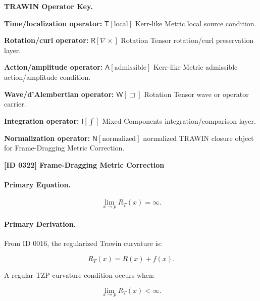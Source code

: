 \par\vspace{0.45\baselineskip}
\noindent\begin{minipage}[t]{\linewidth}
\begingroup
\small
\raggedright
\textbf{TRAWIN Operator Key.}\par
\noindent\textbf{Time/localization operator:} $\mathsf{T}\!\left[\mathrm{local}\right]$ Kerr-like Metric local source condition.\par
\noindent\textbf{Rotation/curl operator:} $\mathsf{R}\!\left[\nabla\times\right]$ Rotation Tensor rotation/curl preservation layer.\par
\noindent\textbf{Action/amplitude operator:} $\mathsf{A}\!\left[\mathrm{admissible}\right]$ Kerr-like Metric admissible action/amplitude condition.\par
\noindent\textbf{Wave/d'Alembertian operator:} $\mathsf{W}\!\left[\Box\right]$ Rotation Tensor wave or operator carrier.\par
\noindent\textbf{Integration operator:} $\mathsf{I}\!\left[\int\right]$ Mixed Components integration/comparison layer.\par
\noindent\textbf{Normalization operator:} $\mathsf{N}\!\left[\mathrm{normalized}\right]$ normalized TRAWIN closure object for Frame-Dragging Metric Correction.\par
\endgroup
\end{minipage}

\clearpage
\noindent\textbf{[ID 0322] Frame-Dragging Metric Correction}\par
\vspace{0.35em}
\paragraph{Primary Equation.}
\begin{equation}
\lim_{x\to p}R_T(x)=\infty .
\end{equation}

\paragraph{Primary Derivation.}
From ID 0016, the regularized Trawin curvature is:

\begin{equation}
R_T(x)=R(x)+f(x).
\end{equation}

A regular TZP curvature condition occurs when:

\begin{equation}
\lim_{x\to p}R_T(x)<\infty .
\end{equation}

